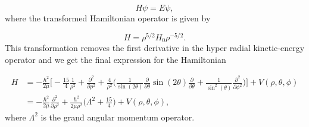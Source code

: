 \begin{equation}
H \psi = E \psi,
\end{equation}
where the transformed Hamiltonian operator is given by

\begin{equation}
H = \rho^{5/2}H_{0} \rho^{-5/2}. 
\end{equation}
This transformation removes the first derivative in the hyper radial kinetic-energy operator and we get the final expression for the Hamiltonian

\begin{align}
H &= -\frac{\hbar^{2}}{2 \mu} \Bigg[ -\frac{15}{4} \frac{1}{\rho^{2}} + \frac{\partial^{2}}{\partial \rho^{2}}+ \frac{4}{\rho^{2}}\Big( \frac{1}{\sin(2\theta)} \frac{\partial}{\partial \theta} \sin(2\theta) \frac{\partial}{\partial \theta} + \frac{1}{\sin^{2}(\theta)} \frac{\partial^{2}}{\partial \phi^{2}} \Big) \Bigg] + V(\rho, \theta, \phi)\\
&= -\frac{\hbar^{2}}{2 \mu}\frac{\partial^2}{\partial \rho^2} + \frac{\hbar^{2}}{2 \mu \rho^{2} } \Bigg(\Lambda^2 + \frac{15}{4}\Bigg)+ V(\rho, \theta, \phi),
\end{align}
where $\Lambda^2$ is the grand angular momentum operator.   